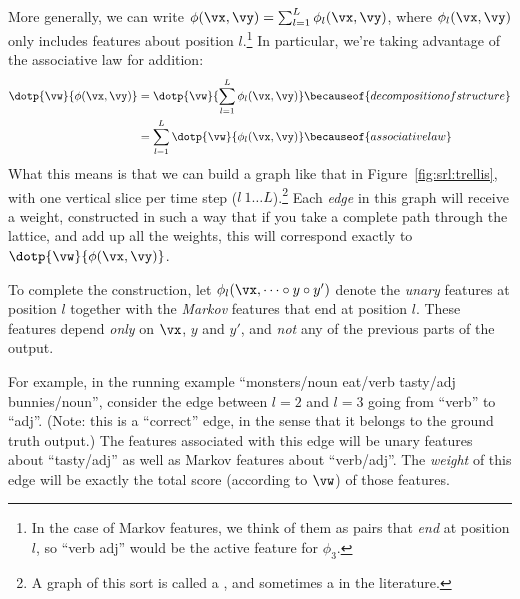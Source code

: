 More generally, we can write $\phi(\vx,\vy) = \sum_{l=1}^L \phi_l(\vx,\vy)$, where $\phi_l(\vx,\vy)$ only includes features about position $l$.\footnote{In the case of Markov features, we think of them as pairs that \emph{end} at position $l$, so ``verb adj'' would be the active feature for $\phi_3$.}
In particular, we're taking advantage of the associative law for addition:
%
\begin{align}
  \dotp{\vw}{\phi(\vx,\vy)}
  &= \dotp{\vw}{\sum_{l=1}^L \phi_l(\vx, \vy)} \becauseof{decomposition of structure} \\
  &= \sum_{l=1}^L \dotp{\vw}{\phi_l(\vx, \vy)} \becauseof{associative law}
\end{align}
%
What this means is that we can build a graph like that in Figure~\ref{fig:srl:trellis}, with one vertical slice per time step ($l \ 1 \dots L$).\footnote{A graph of this sort is called a , and sometimes a  in the literature.}
Each \emph{edge} in this graph will receive a weight, constructed in such a way that if you take a complete path through the lattice, and add up all the weights, this will correspond exactly to $\dotp{\vw}{\phi(\vx,\vy)}$.


To complete the construction, let $\phi_l(\vx, \dots \circ y \circ y')$ denote the \emph{unary} features at position $l$ together with the \emph{Markov} features that end at position $l$. These features depend \emph{only} on $\vx$, $y$ and $y'$, and \emph{not} any of the previous parts of the output.

For example, in the running example ``monsters/noun eat/verb tasty/adj bunnies/noun'', consider the edge between $l=2$ and $l=3$ going from ``verb'' to ``adj''. (Note: this is a ``correct'' edge, in the sense that it belongs to the ground truth output.)
The features associated with this edge will be unary features about ``tasty/adj'' as well as Markov features about ``verb/adj''.
The \emph{weight} of this edge will be exactly the total score (according to $\vw$) of those features.

